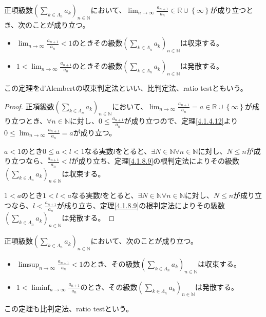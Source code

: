 \documentclass[dvipdfmx]{jsarticle}
\begin{document}
\begin{thm}[d'Alembertの収束判定法]\label{4.1.8.10}
正項級数$\left( \sum_{k \in \varLambda_{n}} a_{k} \right)_{n \in \mathbb{N}}$において、$\lim_{n \rightarrow \infty}\frac{a_{n + 1}}{a_{n}} \in \mathbb{R} \cup \left\{ \infty \right\}$が成り立つとき、次のことが成り立つ。
\begin{itemize}
\item
  $\lim_{n \rightarrow \infty}\frac{a_{n + 1}}{a_{n}} < 1$のときその級数$\left( \sum_{k \in \varLambda_{n}} a_{k} \right)_{n \in \mathbb{N}}$は収束する。
\item
  $1 < \lim_{n \rightarrow \infty}\frac{a_{n + 1}}{a_{n}}$のときその級数$\left( \sum_{k \in \varLambda_{n}} a_{k} \right)_{n \in \mathbb{N}}$は発散する。
\end{itemize}
この定理をd'Alembertの収束判定法といい、比判定法、ratio testともいう。
\end{thm}
\begin{proof}
正項級数$\left( \sum_{k \in \varLambda_{n}} a_{k} \right)_{n \in \mathbb{N}}$において、$\lim_{n \rightarrow \infty}\frac{a_{n + 1}}{a_{n}} = a \in \mathbb{R} \cup \left\{ \infty \right\}$が成り立つとき、$\forall n \in \mathbb{N}$に対し、$0 \leq \frac{a_{n + 1}}{a_{n}}$が成り立つので、定理\ref{4.1.4.12}より$0 \leq \lim_{n \rightarrow \infty}\frac{a_{n + 1}}{a_{n}} = a$が成り立つ。\par
$a < 1$のとき$0 \leq a < l < 1$なる実数$l$をとると、$\exists N \in \mathbb{N}\forall n \in \mathbb{N}$に対し、$N \leq n$が成り立つなら、$\frac{a_{n + 1}}{a_{n}} < l$が成り立ち、定理\ref{4.1.8.9}の根判定法によりその級数$\left( \sum_{k \in \varLambda_{n}} a_{k} \right)_{n \in \mathbb{N}}$は収束する。\par
$1 < a$のとき$1 < l < a$なる実数$l$をとると、$\exists N \in \mathbb{N}\forall n \in \mathbb{N}$に対し、$N \leq n$が成り立つなら、$l < \frac{a_{n + 1}}{a_{n}}$が成り立ち、定理\ref{4.1.8.9}の根判定法によりその級数$\left( \sum_{k \in \varLambda_{n}} a_{k} \right)_{n \in \mathbb{N}}$は発散する。
\end{proof}
\begin{thm}[比判定法]\label{4.1.8.11}
正項級数$\left( \sum_{k \in \varLambda_{n}} a_{k} \right)_{n \in \mathbb{N}}$において、次のことが成り立つ。
\begin{itemize}
\item
  $\limsup_{n \rightarrow \infty}\frac{a_{n + 1}}{a_{n}} < 1$のとき、その級数$\left( \sum_{k \in \varLambda_{n}} a_{k} \right)_{n \in \mathbb{N}}$は収束する。
\item
  $1 < \liminf_{n \rightarrow \infty}\frac{a_{n + 1}}{a_{n}}$のとき、その級数$\left( \sum_{k \in \varLambda_{n}} a_{k} \right)_{n \in \mathbb{N}}$は発散する。
\end{itemize}
この定理も比判定法、ratio testという。
\end{thm}
\end{document}
